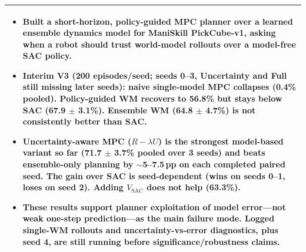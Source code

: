 \documentclass[letterpaper,11pt]{article}
\newcommand{\resumeItem}[1]{
  \item\small{
    {#1 \vspace{-2pt}}
  }
}
\newcommand{\resumeItemListStart}{\begin{itemize}}
\newcommand{\resumeItemListEnd}{\end{itemize}\vspace{-5pt}}
\begin{document}
\begin{longtable}{|@{\hspace{0.6em}}p{\dimexpr\textwidth-1.2em\relax}@{\hspace{0.6em}}|}
\begin{minipage}{\dimexpr\linewidth-1.2em\relax}
\resumeItemListStart
\vspace{0.5em}
\resumeItem{Built a short-horizon, policy-guided MPC planner over a learned ensemble dynamics model for ManiSkill \textbf{PickCube-v1}, asking when a robot should trust world-model rollouts over a model-free SAC policy.}

\vspace{-0.15em}
\resumeItem{\textbf{Interim V3} (200 episodes/seed; seeds 0--3, Uncertainty and Full still missing later seeds): naive single-model MPC \textbf{collapses} (\textbf{0.4\%} pooled). Policy-guided WM recovers to \textbf{56.8\%} but stays below SAC (\textbf{67.9 $\pm$ 3.1\%}). Ensemble WM (\textbf{64.8 $\pm$ 4.7\%}) is \textbf{not consistently} better than SAC.}

\vspace{-0.15em}
\resumeItem{Uncertainty-aware MPC ($R-\lambda U$) is the strongest model-based variant so far (\textbf{71.7 $\pm$ 3.7\%} pooled over 3 seeds) and beats ensemble-only planning by \textbf{$\sim$5--7.5\,pp} on each completed paired seed. The gain over SAC is \textbf{seed-dependent} (wins on seeds 0--1, loses on seed 2). Adding $V_{\mathrm{SAC}}$ does \textbf{not} help (\textbf{63.3\%}).}

\vspace{-0.15em}
\resumeItem{These results support planner exploitation of model error---not weak one-step prediction---as the main failure mode. Logged single-WM rollouts and uncertainty-vs-error diagnostics, plus seed 4, are still running before significance/robustness claims.}
\resumeItemListEnd
\end{minipage} \\
\hline

\end{longtable}
  
\vspace{1em}

\vspace{-1.8em}
\end{document}
